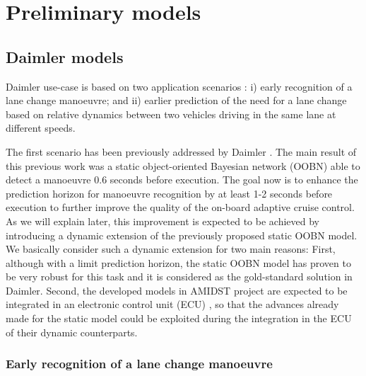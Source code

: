 \section{Preliminary models}
\label{Section:PreliminaryModels}
\subsection{Daimler models}
\label{Section:DaimlerModels}



Daimler use-case is based on two application scenarios \cite{Fer14}: i) early recognition of a lane change manoeuvre; and ii) earlier prediction of the need for a lane change based on relative dynamics between two vehicles driving in the same lane at different speeds. 

The first scenario has been previously addressed by Daimler \cite{kasper2012object}. The main result of this previous work was a static object-oriented Bayesian network (OOBN) \cite{KollerPfeffer1997} able to detect a manoeuvre 0.6 seconds before execution. The goal now is to enhance the prediction horizon for manoeuvre recognition by at least 1-2 seconds before execution to further improve the quality of the on-board adaptive cruise control. As we will explain later, this improvement is expected to be achieved by introducing a dynamic extension of the previously proposed static OOBN model. We basically consider such a dynamic extension for two main reasons: First, although with a limit prediction horizon, the static OOBN model has proven to be very robust for this task and it is considered as the gold-standard solution in Daimler. Second, the developed models in AMIDST project are expected to be integrated in an electronic control unit (ECU) \cite{Fer14}, so that the advances already made for the static model \cite{Weidl2014} could be exploited during the integration in the ECU of their dynamic counterparts. 

\subsubsection{Early recognition of a lane change manoeuvre}\label{Section:Daimler:EarlyRecognition}

